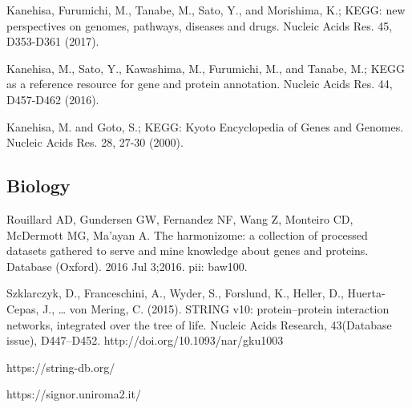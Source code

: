  Kanehisa, Furumichi, M., Tanabe, M., Sato, Y., and Morishima, K.; 
\newblock KEGG: new perspectives on genomes, pathways, diseases and drugs. 
\newblock Nucleic Acids Res. 45, D353-D361 (2017).

 Kanehisa, M., Sato, Y., Kawashima, M., Furumichi, M., and Tanabe, M.; 
\newblock KEGG as a reference resource for gene and protein annotation. 
\newblock Nucleic Acids Res. 44, D457-D462 (2016).

 Kanehisa, M. and Goto, S.; 
\newblock KEGG: Kyoto Encyclopedia of Genes and Genomes. 
\newblock Nucleic Acids Res. 28, 27-30 (2000). 

\subsection{Biology}

 Rouillard AD, Gundersen GW, Fernandez NF, Wang Z, Monteiro CD, McDermott MG, Ma'ayan A. 
\newblock The harmonizome: a collection of processed datasets gathered to serve and mine knowledge about genes and proteins. 
\newblock Database (Oxford). 2016 Jul 3;2016. pii: baw100.

Szklarczyk, D., Franceschini, A., Wyder, S., Forslund, K., Heller, D., Huerta-Cepas, J., … von Mering, C. (2015). 
\newblock STRING v10: protein–protein interaction networks, integrated over the tree of life. 
\newblock Nucleic Acids Research, 43(Database issue), D447–D452. http://doi.org/10.1093/nar/gku1003

 https://string-db.org/

https://signor.uniroma2.it/

